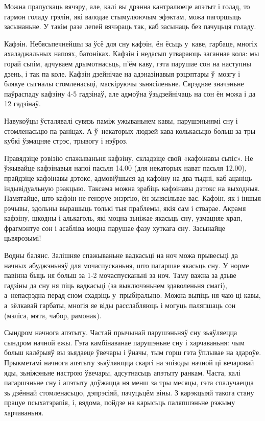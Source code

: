 Можна прапускаць вячэру, але, калі вы дрэнна кантралюеце апэтыт і голад, то гармон голаду грэлін, які валодае стымулюючым эфэктам, можа пагоршыць засынаньне. У такім разе лепей вячэраць так, каб засынаць без пачуцьця голаду.

Кафэін. Небясьпечнейшы за ўсё для сну кафэін, ён ёсьць у~каве, гарбаце, многіх ахаладжальных напоях, батоніках. Кафэін і недасып утвараюць заганнае кола: мы горай сьпім, адчуваем дрымотнасьць, п'ём каву, гэта парушае сон на наступны дзень, і так па коле. Кафэін дзейнічае на адэназінавыя рэцэптары ў~мозгу і блякуе сыгналы стомленасьці, маскіруючы зьнясіленьне. Сярэдняе значэньне паўраспаду кафэіну 4-5 гадзінаў, але адмоўна ўзьдзейнічаць на сон ён можа і да 12 гадзінаў.

Навукоўцы ўсталявалі сувязь паміж ужываньнем кавы, парушэньнямі сну і стомленасьцю па раніцах. А ў~некаторых людзей кава колькасьцю больш за тры кубкі ўзмацняе стрэс, трывогу і нэўроз.

Правядзіце рэвізію спажываньня кафэіну, складзіце свой «кафэінавы сьпіс». Не ўжывайце кафэінавыя напоі пасьля 14.00 (для некаторых нават пасьля 12.00), прайдзіце кафэінавы дэтокс, адмовіўшыся ад кафэіну на два тыдні, каб ацаніць індывідуальную рэакцыю. Таксама можна зрабіць кафэінавы дэтокс на выходныя. Памятайце, што кафэін не генэруе энэргію, ён зьнясільвае вас. Кафэін, як і іншыя рэчывы, здольны вырашыць толькі тыя праблемы, якія сам і стварае. Акрамя кафэіну, шкодны і алькаголь, які моцна зьніжае якасьць сну, узмацняе храп, фрагмэнтуе сон і асабліва моцна парушае фазу хуткага сну. Засынайце цьвярозымі!

Водны балянс. Залішняе спажываньне вадкасьці на ноч можа прывесьці да начных абуджэньняў для мочаспусканьня, што пагаршае якасьць сну. У норме павінна быць ня больш за 1-2 мочаспусканьні за ноч. Таму важна за дзьве гадзіны да сну ня піць вадкасьці (за выключэньнем здаволеньня смагі), а~непасрэдна перад сном схадзіць у~прыбіральню. Можна выпіць ня чаю ці кавы, а~зёлкавай гарбаты, многія яе віды расслабляюць і могуць паляпшаць сон (мэліса, мята, чабор, рамонак).

Сындром начнога апэтыту. Частай прычынай парушэньняў сну зьяўляецца сындром начной ежы. Гэта камбінаванае парушэньне сну і харчаваньня: чым больш калёрыяў вы зьядаеце ўвечары і ўначы, тым горш гэта ўплывае на здароўе. Прыкметамі начнога апэтыту зьяўляюцца скаргі на эпізоды начной ці вечаровай яды, зьніжэньне настрою ўвечары, адсутнасьць апэтыту ранкам. Часта, калі пагаршэньне сну і апэтыту доўжацца ня менш за тры месяцы, гэта спалучаецца зь дзённай стомленасьцю, дэпрэсіяй, пачуцьцём віны. З карэкцыяй такога стану працуе псыхатэрапія, і, вядома, пойдзе на карысьць паляпшэньне рэжыму харчаваньня.

